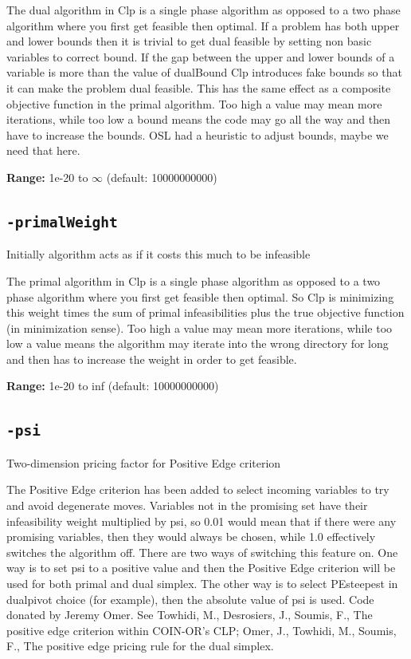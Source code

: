 \documentclass[11pt,a4paper]{article}
\begin{document}
The dual algorithm in Clp is a single phase algorithm as opposed to a two phase algorithm where you first get feasible then optimal.  If a problem has both upper and lower bounds then it is trivial to get dual feasible by setting non basic variables to correct bound.  If the gap between the upper and lower bounds of a variable is more than the value of dualBound Clp introduces fake bounds so that it can make the problem dual feasible.  This has the same effect as a composite objective function in the primal algorithm.  Too high a value may mean more iterations, while too low a bound means the code may go all the way and then have to increase the bounds.  OSL had a heuristic to adjust bounds, maybe we need that here.

\textbf{Range:} 1e-20 to $\infty$ (default: 10000000000)

\subsection*{\texttt{-primalWeight}}

Initially algorithm acts as if it costs this much to be infeasible

The primal algorithm in Clp is a single phase algorithm as opposed to a two phase algorithm where you first get feasible then optimal.  So Clp is minimizing this weight times the sum of primal infeasibilities plus the true objective function (in minimization sense). Too high a value may mean more iterations, while too low a value means the algorithm may iterate into the wrong directory for long and then has to increase the weight in order to get feasible.

\textbf{Range:} 1e-20 to inf (default: 10000000000)

\subsection*{\texttt{-psi}}

Two-dimension pricing factor for Positive Edge criterion

The Positive Edge criterion has been added to select incoming variables to try and avoid degenerate moves. Variables not in the promising set have their infeasibility weight multiplied by psi, so 0.01 would mean that if there were any promising variables, then they would always be chosen, while 1.0 effectively switches the algorithm off. There are two ways of switching this feature on. One way is to set psi to a positive value and then the Positive Edge criterion will be used for both primal and dual simplex. The other way is to select PEsteepest in dualpivot choice (for example), then the absolute value of psi is used. Code donated by Jeremy Omer. See Towhidi, M., Desrosiers, J., Soumis, F., The positive edge criterion within COIN-OR's CLP; Omer, J., Towhidi, M., Soumis, F., The positive edge pricing rule for the dual simplex.
\end{document}
